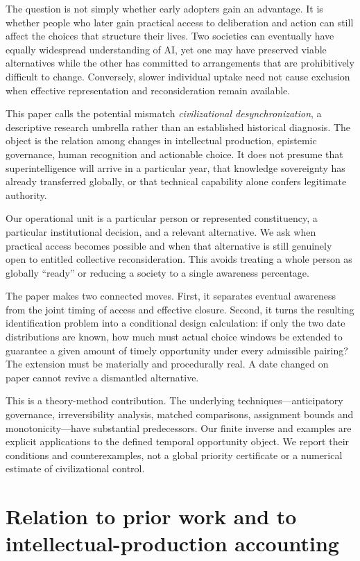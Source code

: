 \documentclass[11pt,a4paper]{article}
\theoremstyle{definition}\newtheorem{definition}{Definition}
\begin{document}
The question is not simply whether early adopters gain an advantage. It is whether people who later gain practical access to deliberation and action can still affect the choices that structure their lives. Two societies can eventually have equally widespread understanding of AI, yet one may have preserved viable alternatives while the other has committed to arrangements that are prohibitively difficult to change. Conversely, slower individual uptake need not cause exclusion when effective representation and reconsideration remain available.

This paper calls the potential mismatch \emph{civilizational desynchronization}, a descriptive research umbrella rather than an established historical diagnosis. The object is the relation among changes in intellectual production, epistemic governance, human recognition and actionable choice. It does not presume that superintelligence will arrive in a particular year, that knowledge sovereignty has already transferred globally, or that technical capability alone confers legitimate authority.

Our operational unit is a particular person or represented constituency, a particular institutional decision, and a relevant alternative. We ask when practical access becomes possible and when that alternative is still genuinely open to entitled collective reconsideration. This avoids treating a whole person as globally ``ready'' or reducing a society to a single awareness percentage.

The paper makes two connected moves. First, it separates eventual awareness from the joint timing of access and effective closure. Second, it turns the resulting identification problem into a conditional design calculation: if only the two date distributions are known, how much must actual choice windows be extended to guarantee a given amount of timely opportunity under every admissible pairing? The extension must be materially and procedurally real. A date changed on paper cannot revive a dismantled alternative.

This is a theory-method contribution. The underlying techniques---anticipatory governance, irreversibility analysis, matched comparisons, assignment bounds and monotonicity---have substantial predecessors. Our finite inverse and examples are explicit applications to the defined temporal opportunity object. We report their conditions and counterexamples, not a global priority certificate or a numerical estimate of civilizational control.

\section{Relation to prior work and to intellectual-production accounting}
\label{sec:prior}
\end{document}

